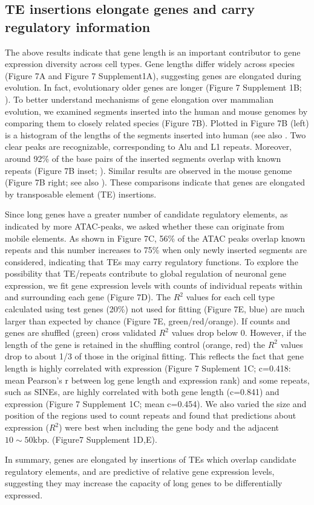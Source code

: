 \subsection{TE insertions elongate genes and carry regulatory information}

The above results indicate that gene length is an important contributor to gene expression diversity across cell types. Gene lengths differ widely across species (Figure 7A and Figure 7 Supplement1A), suggesting genes are elongated during evolution. In fact, evolutionary older genes are longer (Figure 7 Supplement 1B; \cite{Grishkevich_2014}). To better understand mechanisms of gene elongation over mammalian evolution, we examined segments inserted into the human and mouse genomes by comparing them to closely related species (Figure 7B). Plotted in Figure 7B (left) is a histogram of the lengths of the segments inserted into human (see also \cite{and_Analysis_Consortium_2005}. Two clear peaks are recognizable, corresponding to Alu and L1 repeats. Moreover, around 92\% of the base pairs of the inserted segments overlap with known repeats (Figure 7B inset; \cite{Bao_2015}). Similar results are observed in the mouse genome (Figure 7B right; see also \cite{Pozzoli_2007}). These comparisons indicate that genes are elongated by transposable element (TE) insertions. 

Since long genes have a greater number of candidate regulatory elements, as indicated by more ATAC-peaks, we asked whether these can originate from mobile elements. As shown in Figure 7C, 56\% of the ATAC peaks overlap known repeats and this number increases to 75\% when only newly inserted segments are considered, indicating that TEs may carry regulatory functions. To explore the possibility that TE/repeats contribute to global regulation of neuronal gene expression, we fit gene expression levels with counts of individual repeats within and surrounding each gene (Figure 7D).  The $R^2$ values for each cell type calculated using test genes (20\%) not used for fitting (Figure 7E, blue) are much larger than expected by chance (Figure 7E, green/red/orange). If counts and genes are shuffled (green) cross validated $R^2$ values drop below 0. However, if the length of the gene is retained in the shuffling control (orange, red) the $R^2$ values drop to about 1/3 of those in the original fitting. This reflects the fact that gene length is highly correlated with expression (Figure 7 Suplement 1C; c=0.418: mean Pearson's r between log gene length and expression rank) and some repeats, such as SINEs, are highly correlated with both gene length (c=0.841) and expression (Figure 7 Supplement 1C; mean c=0.454). We also varied the size and position of the regions used to count repeats and found that predictions about expression ($R^2$) were best when including the gene body and the adjacent $10\sim 50$kbp. (Figure7 Supplement 1D,E). 

In summary, genes are elongated by insertions of TEs which overlap candidate regulatory elements, and are predictive of relative gene expression levels, suggesting they may increase the capacity of long genes to be differentially expressed. 


